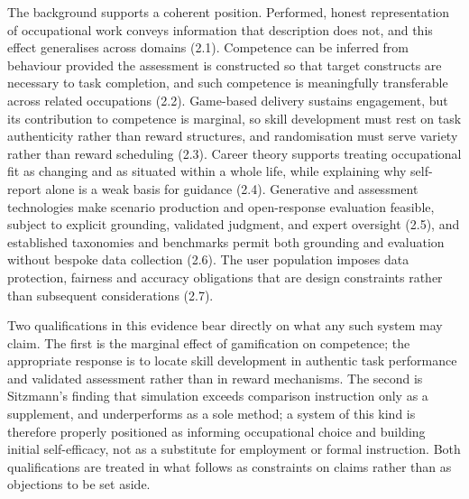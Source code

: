 The background supports a coherent position. Performed, honest representation of occupational work conveys information that description does not, and this effect generalises across domains (2.1). Competence can be inferred from behaviour provided the assessment is constructed so that target constructs are necessary to task completion, and such competence is meaningfully transferable across related occupations (2.2). Game-based delivery sustains engagement, but its contribution to competence is marginal, so skill development must rest on task authenticity rather than reward structures, and randomisation must serve variety rather than reward scheduling (2.3). Career theory supports treating occupational fit as changing and as situated within a whole life, while explaining why self-report alone is a weak basis for guidance (2.4). Generative and assessment technologies make scenario production and open-\allowbreak{}response evaluation feasible, subject to explicit grounding, validated judgment, and expert oversight (2.5), and established taxonomies and benchmarks permit both grounding and evaluation without bespoke data collection (2.6). The user population imposes data protection, fairness and accuracy obligations that are design constraints rather than subsequent considerations (2.7).

Two qualifications in this evidence bear directly on what any such system may claim. The first is the marginal effect of gamification on competence\cite{r33}; the appropriate response is to locate skill development in authentic task performance and validated assessment rather than in reward mechanisms. The second is Sitzmann's finding that simulation exceeds comparison instruction only as a supplement, and underperforms as a sole method\cite{r36}; a system of this kind is therefore properly positioned as informing occupational choice and building initial self-\allowbreak{}efficacy, not as a substitute for employment or formal instruction. Both qualifications are treated in what follows as constraints on claims rather than as objections to be set aside.
